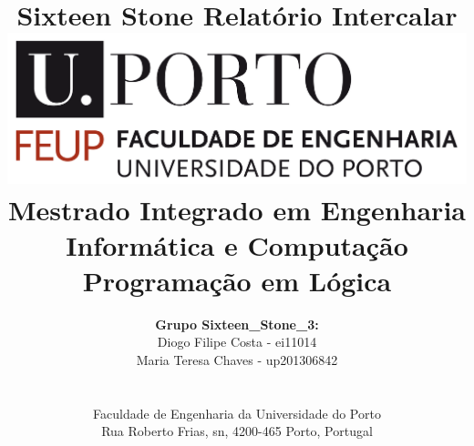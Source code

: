 \documentclass[a4paper]{article}
\begin{document}
\setlength{\textwidth}{16cm}
\setlength{\textheight}{22cm}

\title{\Huge\textbf{Sixteen Stone}\linebreak\linebreak\linebreak
\Large\textbf{Relatório Intercalar}\linebreak\linebreak
\linebreak\linebreak
\includegraphics[scale=0.1]{images/feup-logo.png}\linebreak\linebreak
\linebreak\linebreak
\Large{Mestrado Integrado em Engenharia Informática e Computação} \linebreak\linebreak
\Large{Programação em Lógica}\linebreak
}

\author{\textbf{Grupo Sixteen\_Stone\_3:}\\
Diogo Filipe Costa - ei11014 \\
Maria Teresa Chaves - up201306842 \\
\linebreak\linebreak \\
 \\ Faculdade de Engenharia da Universidade do Porto \\ Rua Roberto Frias, s\/n, 4200-465 Porto, Portugal \linebreak\linebreak\linebreak
\linebreak\linebreak\vspace{1cm}}

\maketitle
\thispagestyle{empty}
\end{document}
